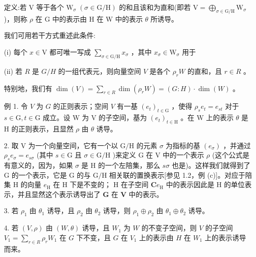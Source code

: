 \documentclass[10pt]{article}
\begin{document}
定义:若 \(\mathrm{V}\) 等于各个 \({\mathrm{W}}_{\sigma } \; \left( {\sigma  \in  \mathrm{G}/\mathrm{H}}\right)\) 的和且该和为直和(即若 \(\mathrm{V} = {\bigoplus }_{\sigma  \in  \mathrm{G}/\mathrm{H}}{\mathrm{W}}_{\sigma }\) )，则称 \(\rho\) 在 \(\mathrm{G}\) 中的表示由 \(\mathrm{H}\) 在 \(\mathrm{W}\) 中的表示 \(\theta\) 所诱导。

我们可用若干方式重述此条件:

(i) 每个 \(x \in  \mathrm{V}\) 都可唯一写成 \(\mathop{\sum }\limits_{{\sigma  \in  \mathrm{G}/\mathrm{H}}}{x}_{\sigma }\) ，其中 \({x}_{\sigma } \in  {\mathrm{W}}_{\sigma }\) 用于

(ii) 若 \(R\) 是 \(G/H\) 的一组代表元，则向量空间 \(V\) 是各个 \({\rho }_{r}W\) 的直和，且 \(r \in  R\) 。

特别地，我们有 \(\dim \left( V\right)  = \mathop{\sum }\limits_{{r \in  R}}\dim \left( {{\rho }_{r}W}\right)  = \left( {G : H}\right)  \cdot  \dim \left( W\right)\) 。

例 1. 令 \(V\) 为 \(G\) 的正则表示；空间 \(V\) 有一基 \({\left( {e}_{t}\right) }_{t \in  \mathrm{G}}\) ，使得 \({\rho }_{s}{e}_{t} = {e}_{st}\) 对于 \(s \in  \mathrm{G},t \in  \mathrm{G}\) 成立。设 \(\mathrm{W}\) 为 \(\mathrm{V}\) 的子空间，基为 \({\left( {e}_{t}\right) }_{t \in  \mathrm{H}}\) 。在 \(\mathrm{W}\) 上的表示 \(\theta\) 是 \(\mathrm{H}\) 的正则表示，且显然 \(\rho\) 由 \(\theta\) 诱导。

2. 取 \(\mathrm{V}\) 为一个向量空间，它有一个以 \(\mathrm{G}/\mathrm{H}\) 的元素 \(\sigma\) 为指标的基 \(\left( {e}_{\sigma }\right)\) ，并通过 \({\rho }_{s}{e}_{\sigma } = {e}_{s\sigma }\) (其中 \(s \in  \mathrm{G}\) 且 \(\sigma  \in  \mathrm{G}/\mathrm{H}\) )来定义 \(\mathrm{G}\) 在 \(\mathrm{V}\) 中的一个表示 \(\rho\) (这个公式是有意义的，因为，如果 \(\sigma\) 是 \(\mathrm{H}\) 的一个左陪集，那么 \({s\sigma }\) 也是)。这样我们就得到了 \(\mathrm{G}\) 的一个表示，它是 \(\mathrm{G}\) 的与 \(\mathrm{G}/\mathrm{H}\) 相关联的置换表示[参见 1.2，例 (c)]。对应于陪集 \(\mathrm{H}\) 的向量 \({e}_{\mathrm{H}}\) 在 \(\mathrm{H}\) 下是不变的； \(\mathrm{H}\) 在子空间 \(\mathbf{C}{e}_{\mathrm{H}}\) 中的表示因此是 \(\mathrm{H}\) 的单位表示，并且显然这个表示诱导出了 \(\mathbf{G}\) 在 \(\mathbf{V}\) 中的表示。

3. 若 \({\rho }_{1}\) 由 \({\theta }_{1}\) 诱导，且 \({\rho }_{2}\) 由 \({\theta }_{2}\) 诱导，则 \({\rho }_{1} \oplus  {\rho }_{2}\) 由 \({\theta }_{1} \oplus  {\theta }_{2}\) 诱导。

4. 若 \(\left( {V,\rho }\right)\) 由 \(\left( {W,\theta }\right)\) 诱导，且 \({W}_{1}\) 为 \(W\) 的不变子空间，则 \(V\) 的子空间 \({V}_{1} = \mathop{\sum }\limits_{{r \in  R}}{\rho }_{r}{W}_{1}\) 在 \(G\) 下不变，且 \(G\) 在 \({V}_{1}\) 上的表示由 \(H\) 在 \({W}_{1}\) 上的表示诱导而来。
\end{document}
